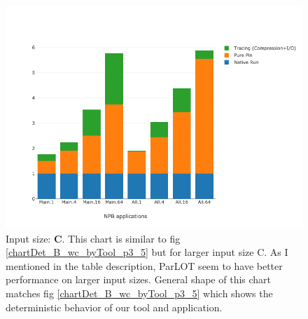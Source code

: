 \begin{figure}[!t]
\centering
\includegraphics[width=5in]{figs.psc/chartDet_C_wc_byTool_p3_5.png}
\caption{Input size: \textbf{C}. This chart is similar to fig \ref{chartDet_B_wc_byTool_p3_5} but for larger input size C. As I mentioned in the table description, ParLOT seem to have better performance on larger input sizes. General shape of this chart matches fig \ref{chartDet_B_wc_byTool_p3_5} which shows the deterministic behavior of our tool and application.}
\label{chartDet_C_wc_byTool_p3_5}
\end{figure}
